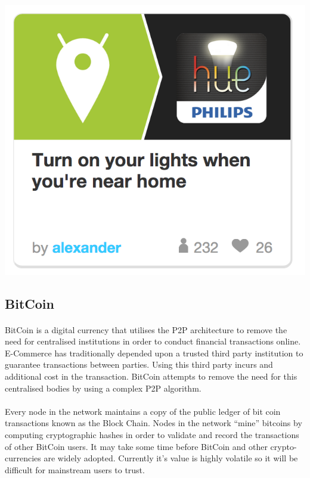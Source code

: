 \documentclass[11pt]{amsart}
\begin{document}
\paragraph{}
\includegraphics[scale=1]{IFTTT}


\subsection{BitCoin}\cite{Bitcoin}
\paragraph{}
BitCoin is a digital currency that utilises the P2P architecture to remove the need for centralised institutions in order to conduct financial transactions online. E-Commerce has traditionally depended upon a trusted third party institution to guarantee transactions between parties. Using this third party incurs and additional cost in the transaction. BitCoin attempts to remove the need for this centralised bodies by using a complex P2P algorithm.
\paragraph{}
Every node in the network maintains a copy of the public ledger of bit coin transactions known as the Block Chain. Nodes in the network ``mine'' bitcoins by computing cryptographic hashes in order to validate and record the transactions of other BitCoin users. It may take some time before BitCoin and other crypto-currencies are widely adopted. Currently it's value is highly volatile so it will be difficult for mainstream users to trust.
\end{document}
